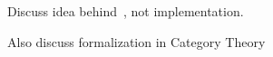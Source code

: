 Discuss idea behind~\cite{ertel_haskell19}, not implementation.

Also discuss formalization in Category Theory~\cite{ertel_haskellsup19}